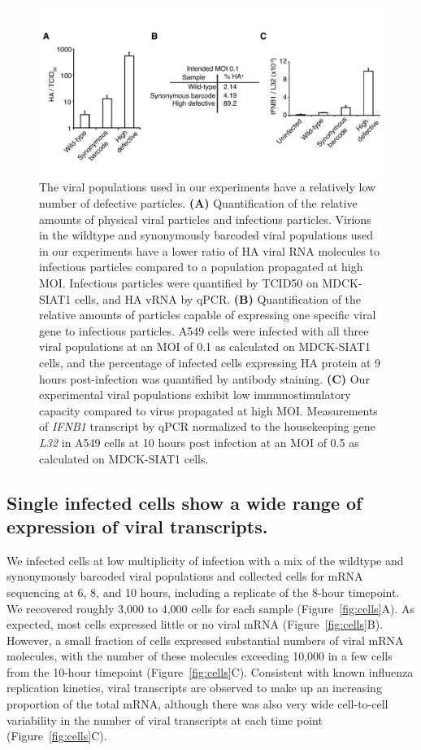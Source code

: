 \documentclass[9pt,lineno]{elife}
\begin{document}
\begin{figure}
\includegraphics[width=0.7\linewidth]{figures/Validating_barcode_virus/validating_populations_D02.pdf}
\caption{\label{fig:viruspopulations} The viral populations used in our experiments have a relatively low number of defective particles. 
{\bf (A)}
Quantification of the relative amounts of physical viral particles and infectious particles.
Virions in the wildtype and synonymously barcoded viral populations used in our experiments have a lower ratio of HA viral RNA molecules to infectious particles compared to a population propagated at high MOI.
Infectious particles were quantified by TCID50 on MDCK-SIAT1 cells, and HA vRNA by qPCR. 
{\bf (B)} 
Quantification of the relative amounts of particles capable of expressing one specific viral gene to infectious particles.
A549 cells were infected with all three viral populations at an MOI of 0.1 as calculated on MDCK-SIAT1 cells, and the percentage of infected cells expressing HA protein at 9 hours post-infection was quantified by antibody staining.
{\bf (C)} Our experimental viral populations exhibit low immunostimulatory capacity compared to virus propagated at high MOI. 
Measurements of \emph{IFNB1} transcript by qPCR normalized to the housekeeping gene \emph{L32} in A549 cells at 10 hours post infection at an MOI of 0.5 as calculated on MDCK-SIAT1 cells.}
\end{figure}

\subsection{Single infected cells show a wide range of expression of viral transcripts.}
We infected cells at low multiplicity of infection with a mix of the wildtype and synonymously barcoded viral populations and collected cells for mRNA sequencing at 6, 8, and 10 hours, including a replicate of the 8-hour timepoint.
We recovered roughly 3,000 to 4,000 cells for each sample (Figure~\ref{fig:cells}A). 
As expected, most cells expressed little or no viral mRNA (Figure~\ref{fig:cells}B).
However, a small fraction of cells expressed substantial numbers of viral mRNA molecules, with the number of these molecules exceeding 10,000 in a few cells from the 10-hour timepoint (Figure~\ref{fig:cells}C). 
Consistent with known influenza replication kinetics, viral transcripts are observed to make up an increasing proportion of the total mRNA, although there was also very wide cell-to-cell variability in the number of viral transcripts at each time point (Figure~\ref{fig:cells}C).
\end{document}
